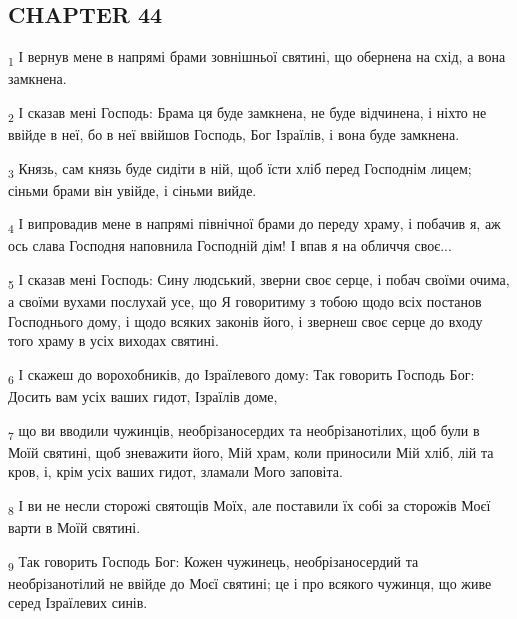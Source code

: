 \subsection{CHAPTER 44}
\begin{tcolorbox}
\textsubscript{1} І вернув мене в напрямі брами зовнішньої святині, що обернена на схід, а вона замкнена.
\end{tcolorbox}
\begin{tcolorbox}
\textsubscript{2} І сказав мені Господь: Брама ця буде замкнена, не буде відчинена, і ніхто не ввійде в неї, бо в неї ввійшов Господь, Бог Ізраїлів, і вона буде замкнена.
\end{tcolorbox}
\begin{tcolorbox}
\textsubscript{3} Князь, сам князь буде сидіти в ній, щоб їсти хліб перед Господнім лицем; сіньми брами він увійде, і сіньми вийде.
\end{tcolorbox}
\begin{tcolorbox}
\textsubscript{4} І випровадив мене в напрямі північної брами до переду храму, і побачив я, аж ось слава Господня наповнила Господній дім! І впав я на обличчя своє...
\end{tcolorbox}
\begin{tcolorbox}
\textsubscript{5} І сказав мені Господь: Сину людський, зверни своє серце, і побач своїми очима, а своїми вухами послухай усе, що Я говоритиму з тобою щодо всіх постанов Господнього дому, і щодо всяких законів його, і звернеш своє серце до входу того храму в усіх виходах святині.
\end{tcolorbox}
\begin{tcolorbox}
\textsubscript{6} І скажеш до ворохобників, до Ізраїлевого дому: Так говорить Господь Бог: Досить вам усіх ваших гидот, Ізраїлів доме,
\end{tcolorbox}
\begin{tcolorbox}
\textsubscript{7} що ви вводили чужинців, необрізаносердих та необрізанотілих, щоб були в Моїй святині, щоб зневажити його, Мій храм, коли приносили Мій хліб, лій та кров, і, крім усіх ваших гидот, зламали Мого заповіта.
\end{tcolorbox}
\begin{tcolorbox}
\textsubscript{8} І ви не несли сторожі святощів Моїх, але поставили їх собі за сторожів Моєї варти в Моїй святині.
\end{tcolorbox}
\begin{tcolorbox}
\textsubscript{9} Так говорить Господь Бог: Кожен чужинець, необрізаносердий та необрізанотілий не ввійде до Моєї святині; це і про всякого чужинця, що живе серед Ізраїлевих синів.
\end{tcolorbox}
